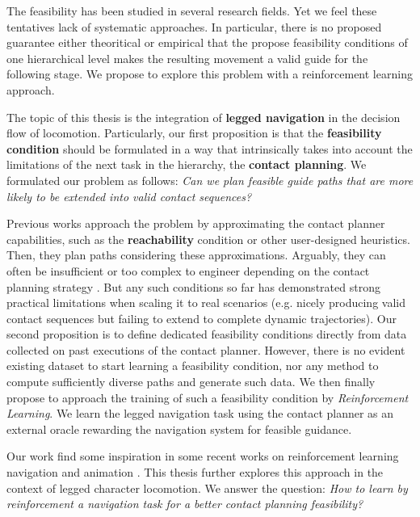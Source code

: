 The feasibility has been studied in several research fields. Yet we feel these tentatives lack of systematic approaches.
In particular, there is no proposed guarantee either theoritical or empirical that the propose feasibility conditions of one hierarchical level makes the resulting movement a valid guide for the following stage.
We propose to explore this problem with a reinforcement learning approach.
\hfill \break
\hfill \break

The topic of this thesis is the integration of \textbf{legged navigation} in the decision flow of locomotion. Particularly, our first proposition is that the \textbf{feasibility condition} should be formulated in a way that intrinsically takes into account the limitations of the next task in the hierarchy, the \textbf{contact planning}.
We formulated our problem as follows: \textit{Can we plan feasible guide paths that are more likely to be extended into valid contact sequences?}

Previous works approach the problem by approximating the contact planner capabilities, such as the \textbf{reachability} condition \cite{RB-PRM} or other user-designed heuristics.
Then, they plan paths considering these approximations.
Arguably, they can often be insufficient or too complex to engineer depending on the contact planning strategy \cite{AcyclicCP, winkler_2014}.
But any such conditions so far has demonstrated strong practical limitations when scaling it to real scenarios (e.g. nicely producing valid contact sequences but failing to extend to complete dynamic trajectories). 
Our second proposition is to define dedicated feasibility conditions directly from data collected on past executions of the contact planner.
However, there is no evident existing dataset to start learning a feasibility condition, nor any method to compute sufficiently diverse paths and generate such data.
We then finally propose to approach the training of such a feasibility condition by \textit{Reinforcement Learning}. We learn the legged navigation task using the contact planner as an external oracle rewarding the navigation system for feasible guidance.

Our work find some inspiration in some recent works on reinforcement learning navigation and animation \cite{prm_rl_2019, deepLoco}. 
This thesis further explores this approach in the context of legged character locomotion.
We answer the question: \textit{How to learn by reinforcement a navigation task for a better contact planning feasibility?}